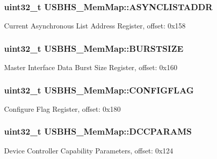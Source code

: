 \subsubsection[{A\+S\+Y\+N\+C\+L\+I\+S\+T\+A\+D\+D\+R}]{\setlength{\rightskip}{0pt plus 5cm}uint32\+\_\+t U\+S\+B\+H\+S\+\_\+\+Mem\+Map\+::\+A\+S\+Y\+N\+C\+L\+I\+S\+T\+A\+D\+D\+R}\label{struct_u_s_b_h_s___mem_map_a23476132035d540710e6723105472ad2}
Current Asynchronous List Address Register, offset\+: 0x158 \hypertarget{struct_u_s_b_h_s___mem_map_a9b684ca58668dd09b45347f5c341378a}{}
\subsubsection[{B\+U\+R\+S\+T\+S\+I\+Z\+E}]{\setlength{\rightskip}{0pt plus 5cm}uint32\+\_\+t U\+S\+B\+H\+S\+\_\+\+Mem\+Map\+::\+B\+U\+R\+S\+T\+S\+I\+Z\+E}\label{struct_u_s_b_h_s___mem_map_a9b684ca58668dd09b45347f5c341378a}
Master Interface Data Burst Size Register, offset\+: 0x160 \hypertarget{struct_u_s_b_h_s___mem_map_a39c994d2356d99a8308d73cb9d89cb78}{}
\subsubsection[{C\+O\+N\+F\+I\+G\+F\+L\+A\+G}]{\setlength{\rightskip}{0pt plus 5cm}uint32\+\_\+t U\+S\+B\+H\+S\+\_\+\+Mem\+Map\+::\+C\+O\+N\+F\+I\+G\+F\+L\+A\+G}\label{struct_u_s_b_h_s___mem_map_a39c994d2356d99a8308d73cb9d89cb78}
Configure Flag Register, offset\+: 0x180 \hypertarget{struct_u_s_b_h_s___mem_map_a0cdb6769bd78be6c996576f92d8d008f}{}
\subsubsection[{D\+C\+C\+P\+A\+R\+A\+M\+S}]{\setlength{\rightskip}{0pt plus 5cm}uint32\+\_\+t U\+S\+B\+H\+S\+\_\+\+Mem\+Map\+::\+D\+C\+C\+P\+A\+R\+A\+M\+S}\label{struct_u_s_b_h_s___mem_map_a0cdb6769bd78be6c996576f92d8d008f}
Device Controller Capability Parameters, offset\+: 0x124 \hypertarget{struct_u_s_b_h_s___mem_map_ac033788854eae485a1d9a238c06abcdc}{}
